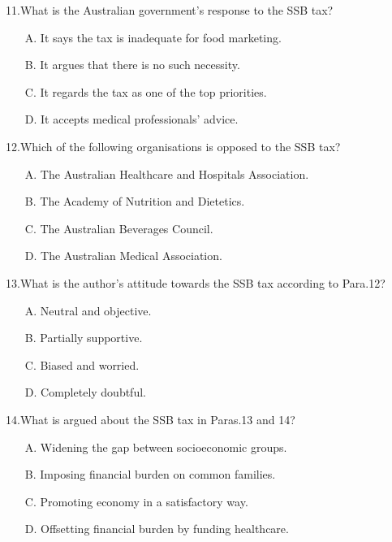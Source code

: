 \documentclass[UTF8,11pt]{ctexart}
\begin{document}
11.What is the Australian government’s response to the SSB tax?


\begin{itemize}[leftmargin=2em,itemsep=.2em,topsep=.4em]\item[A.] It says the tax is inadequate for food marketing.
\item[B.] It argues that there is no such necessity.
\item[C.] It regards the tax as one of the top priorities.
\item[D.] It accepts medical professionals’ advice.
\end{itemize}

12.Which of the following organisations is opposed to the SSB tax?


\begin{itemize}[leftmargin=2em,itemsep=.2em,topsep=.4em]\item[A.] The Australian Healthcare and Hospitals Association.
\item[B.] The Academy of Nutrition and Dietetics.
\item[C.] The Australian Beverages Council.
\item[D.] The Australian Medical Association.
\end{itemize}

13.What is the author’s attitude towards the SSB tax according to Para.12?


\begin{itemize}[leftmargin=2em,itemsep=.2em,topsep=.4em]\item[A.] Neutral and objective.
\item[B.] Partially supportive.
\item[C.] Biased and worried.
\item[D.] Completely doubtful.
\end{itemize}

14.What is argued about the SSB tax in Paras.13 and 14?


\begin{itemize}[leftmargin=2em,itemsep=.2em,topsep=.4em]\item[A.] Widening the gap between socioeconomic groups.
\item[B.] Imposing financial burden on common families.
\item[C.] Promoting economy in a satisfactory way.
\item[D.] Offsetting financial burden by funding healthcare.
\end{itemize}
\end{document}
